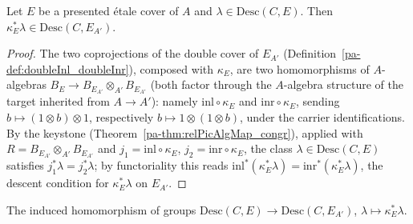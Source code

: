 \begin{lemma}
  \label{pa-lem:baseChangeInclude_mem_descentClasses}
  \leanok

  Let \(E\) be a presented \'etale cover of \(A\) and \(\lambda \in \mathrm{Desc}(C,E)\). Then
  \(\kappa_E^{*}\lambda \in \mathrm{Desc}(C, E_{A'})\).
\end{lemma}
\begin{proof}
  \leanok
  The two coprojections of the double cover of \(E_{A'}\)
  (Definition~\ref{pa-def:doubleInl_doubleInr}), composed with \(\kappa_E\), are two
  homomorphisms of \(A\)-algebras \(B_E \to B_{E_{A'}} \otimes_{A'} B_{E_{A'}}\) (both factor
  through the \(A\)-algebra structure of the target inherited from \(A \to A'\)): namely
  \(\mathrm{inl} \circ \kappa_E\) and \(\mathrm{inr} \circ \kappa_E\), sending \(b \mapsto
  (1 \otimes b) \otimes 1\), respectively \(b \mapsto 1 \otimes (1 \otimes b)\), under the
  carrier identifications. By the keystone (Theorem~\ref{pa-thm:relPicAlgMap_congr}), applied with
  \(R = B_{E_{A'}} \otimes_{A'} B_{E_{A'}}\) and \(j_1 = \mathrm{inl} \circ \kappa_E\), \(j_2 =
  \mathrm{inr} \circ \kappa_E\), the class \(\lambda \in \mathrm{Desc}(C,E)\) satisfies
  \(j_1^{*}\lambda = j_2^{*}\lambda\); by functoriality this reads \(\mathrm{inl}^{*}
  (\kappa_E^{*}\lambda) = \mathrm{inr}^{*}(\kappa_E^{*}\lambda)\), the descent condition for
  \(\kappa_E^{*}\lambda\) on \(E_{A'}\).
\end{proof}

\begin{definition}
  \label{pa-def:descentBaseChange}
  \leanok

  The induced homomorphism of groups \(\mathrm{Desc}(C,E) \to \mathrm{Desc}(C,E_{A'})\),
  \(\lambda \mapsto \kappa_E^{*}\lambda\).
\end{definition}

